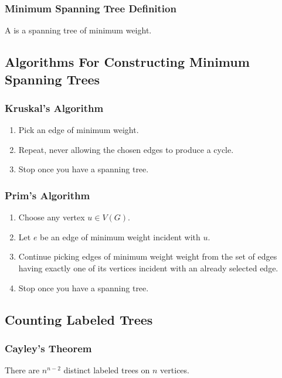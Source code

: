 \subsubsection*{Minimum Spanning Tree Definition}
A  is a spanning tree of minimum weight.

\subsection*{Algorithms For Constructing Minimum Spanning Trees}

\subsubsection*{Kruskal's Algorithm}
\begin{enumerate}
    \item Pick an edge of minimum weight.
    \item Repeat, never allowing the chosen edges to produce a cycle.
    \item Stop once you have a spanning tree.
\end{enumerate}

\subsubsection*{Prim's Algorithm}
\begin{enumerate}
    \item Choose any vertex $u \in V(G)$.
    \item Let $e$ be an edge of minimum weight incident with $u$.
    \item Continue picking edges of minimum weight weight from the set of edges having exactly one of its vertices incident with an already selected edge.
    \item Stop once you have a spanning tree.
\end{enumerate}

\subsection{Counting Labeled Trees}

\subsubsection*{Cayley's Theorem}
There are $n^{n-2}$ distinct labeled trees on $n$ vertices.

